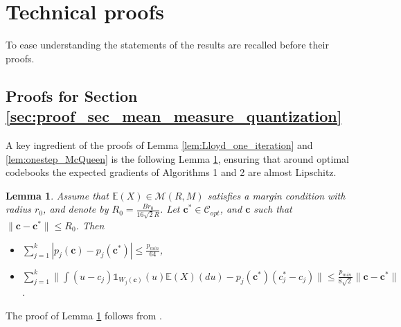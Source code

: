 \documentclass[noinfoline,preprint]{article}
\newtheorem{lem}[theorem]{Lemma}
\newcommand{\cb}{\mathbf{c}}
\newcommand{\E}{\mathbb{E}}
\renewcommand{\1}{\mathds 1}
\begin{document}


\appendix 
\section{Technical proofs}
\label{sec:proof_tecsec}
To ease understanding the statements of the results are recalled before their proofs.
\subsection{Proofs for Section \ref{sec:proof_sec_mean_measure_quantization}}
A key ingredient of the proofs of Lemma \ref{lem:Lloyd_one_iteration} and \ref{lem:onestep_McQueen} is the following Lemma \ref{lem:gradient_margin}, ensuring that around optimal codebooks the expected gradients of Algorithms 1 and 2 are almost Lipschitz. 
\begin{lem}\label{lem:gradient_margin}
Assume that $\E(X) \in \mathcal{M}(R,M)$ satisfies a margin condition with radius $r_0$, and denote by $R_0 = \frac{Br_0}{16\sqrt{2}R}$. Let $\cb^* \in \mathcal{C}_{opt}$, and $\cb$ such that $\|\cb-\cb^*\| \leq R_0$. Then
\begin{itemize}
\item $\sum_{j=1}^{k}|p_j(\cb) - p_j(\cb^*)| \leq \frac{p_{min}}{64}$,
\item $\sum_{j=1}^{k} \| \int(u-c_j)\1_{W_j(\cb)}(u)\E(X)(du) - p_j(\cb^*) (c_j^*-c_j)\| \leq \frac{p_{min}}{8\sqrt{2}}\|\cb - \cb^*\|$.
\end{itemize}
\end{lem}
The proof of Lemma \ref{lem:gradient_margin} follows from \cite[Section A.3]{AppendixLevrard15}.
\end{document}
